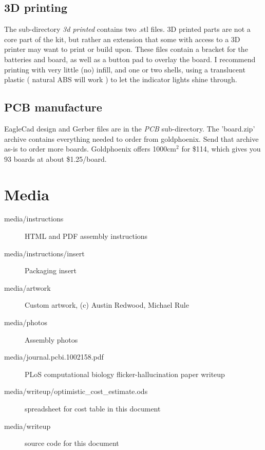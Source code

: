 \documentclass[11pt]{scrartcl}
\begin{document}
\subsection{3D printing}
The sub-directory \emph{3d printed} contains two .stl files.
3D printed parts are not a core part of the kit, but rather an extension that
some with access to a 3D printer may want to print or build upon. 
These files contain a bracket for the batteries and board,
as well as a button pad to overlay the board. 
I recommend printing with very little (no) infill, and one or two shells,
using a translucent plastic ( natural ABS will work ) to let the indicator lights
shine through.

\subsection{PCB manufacture}
EagleCad design and Gerber files are in the \emph{PCB} sub-directory. The 'board.zip' archive contains everything needed to order from goldphoenix. Send that archive as-is to order more boards. Goldphoenix offers 1000cm${}^2$ for \$114, which gives you 93 boards at about \$1.25/board.

\section{Media}

\begin{description}
\item[media/instructions] HTML and PDF assembly instructions
\item[media/instructions/insert] Packaging insert
\item[media/artwork] Custom artwork, (c) Austin Redwood, Michael Rule
\item[media/photos] Assembly photos
\item[media/journal.pcbi.1002158.pdf] PLoS computational biology flicker-hallucination paper writeup
\item[media/writeup/optimistic\_cost\_estimate.ods] spreadsheet for cost table in this document
\item[media/writeup] source code for this document
\end{description}
\end{document}

